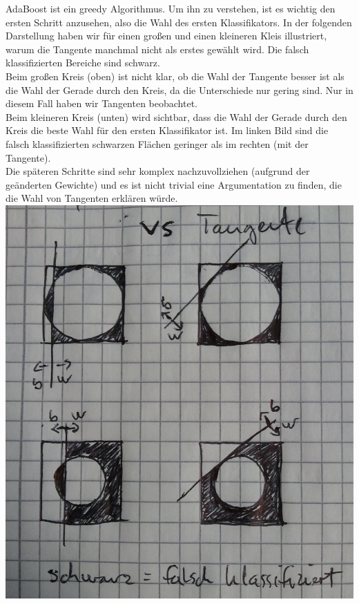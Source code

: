 \documentclass{article}
\begin{document}
AdaBoost ist ein greedy Algorithmus. Um ihn zu verstehen, ist es wichtig den ersten Schritt anzusehen, also die Wahl des ersten Klassifikators. In der folgenden Darstellung haben wir für einen großen und einen kleineren Kleis illustriert, warum die Tangente manchmal nicht als erstes gewählt wird. Die falsch klassifizierten Bereiche sind schwarz.\\
Beim großen Kreis (oben) ist nicht klar, ob die Wahl der Tangente besser ist als die Wahl der Gerade durch den Kreis, da die Unterschiede nur gering sind. Nur in diesem Fall haben wir Tangenten beobachtet.\\
Beim kleineren Kreis (unten) wird sichtbar, dass die Wahl der Gerade durch den Kreis die beste Wahl für den ersten Klassifikator ist. Im linken Bild sind die falsch klassifizierten schwarzen Flächen geringer als im rechten (mit der Tangente).\\
Die späteren Schritte sind sehr komplex nachzuvollziehen (aufgrund der geänderten Gewichte) und es ist nicht trivial eine Argumentation zu finden, die die Wahl von Tangenten erklären würde.\\

\includegraphics[scale=0.21]{zeichnung.jpg}\\
\end{document}

